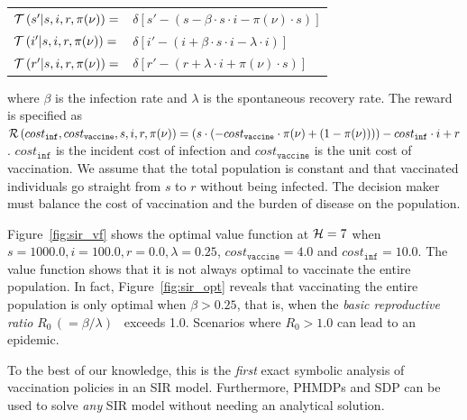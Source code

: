 \documentclass[letterpaper]{article}
\begin{document}
{\footnotesize 
    \begin{tabular}{ll}
        $ \mathcal{T}\left( s' | s, i, r, \pi(\nu) \right) =$ & $ \delta \left[ s' - (s - \beta \cdot s \cdot i - \pi(\nu) \cdot s) \right] $ \\
        $ \mathcal{T}\left( i' | s, i, r, \pi(\nu) \right) =$ & $ \delta \left[ i' - (i + \beta \cdot s \cdot i - \lambda \cdot i) \right] $ \\
        $ \mathcal{T}\left( r' | s, i, r, \pi(\nu) \right) =$ & $ \delta \left[ r' - (r + \lambda \cdot i + \pi(\nu) \cdot s) \right] $ \\            
    \end{tabular}
}%
where {\footnotesize $ \beta $} is the infection rate and {\footnotesize $\lambda$} is the spontaneous recovery rate. The reward is specified as {\footnotesize $ \mathcal{R}\left(cost_{\mathtt{inf}}, cost_{\mathtt{vaccine}}, s, i, r, \pi(\nu) \right) = (s \cdot (-cost_{\mathtt{vaccine}} \cdot \pi(\nu) + (1 - \pi(\nu)))) - cost_{\mathtt{inf}} \cdot i + r$}. {\footnotesize $ cost_{\mathtt{inf}} $} is the incident cost of infection and {\footnotesize $ cost_{\mathtt{vaccine}} $} is the unit cost of vaccination. We assume that the total population is constant and that vaccinated individuals go straight from {\footnotesize $ s $} to {\footnotesize $ r $} without being infected. The decision maker must balance the cost of vaccination and the burden of disease on the population. 

Figure~\ref{fig:sir_vf} shows the optimal value function at {\footnotesize$ \mathcal{H} = 7 $} when {\footnotesize $ s = 1000.0, i = 100.0, r = 0.0, \lambda = 0.25 $}, {\footnotesize $ cost_{\mathtt{vaccine}} = 4.0$} and {\footnotesize $ cost_{\mathtt{inf}} = 10.0 $}. The value function shows that it is not always optimal to vaccinate the entire population. In fact, Figure~\ref{fig:sir_opt} reveals that vaccinating the entire population is only optimal when {\footnotesize $ \beta > 0.25 $}, that is, when the \textit{basic reproductive ratio} {\footnotesize $ R_0 \,(= \beta/\lambda)$}~\cite{Heffernan_2005} exceeds 1.0. Scenarios where {\footnotesize $R_0 > 1.0$} can lead to an epidemic. 

To the best of our knowledge, this is the \textit{first} exact symbolic analysis of vaccination policies in an SIR model. Furthermore, PHMDPs and SDP can be used to solve \textit{any} SIR model without needing an analytical solution.
\end{document}
